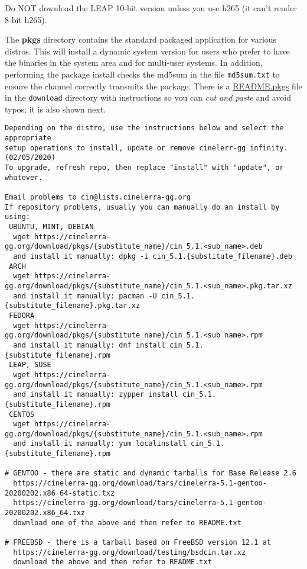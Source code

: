 Do NOT download the LEAP 10-bit version unless you use h265 (it can't render 8-bit h265).

The \textbf{pkgs} directory contains the standard packaged application for various distros.  
This will install a dynamic system version for users who prefer to have the binaries in the system area and for multi-user systems.  
In addition, performing the package install checks the md5sum in the file \texttt{md5sum.txt} to ensure the channel correctly transmits the package.  
There is a {\small \href{https://cinelerra-gg.org/download/README.pkgs}{README.pkgs}} file in the \texttt{download} directory with instructions so you can \textit{ cut and paste} and avoid typos; it is also shown next.

\begin{lstlisting}[numbers=none]
Depending on the distro, use the instructions below and select the appropriate 
setup operations to install, update or remove cinelerr-gg infinity.  (02/05/2020)
To upgrade, refresh repo, then replace "install" with "update", or whatever.

Email problems to cin@lists.cinelerra-gg.org
If repository problems, usually you can manually do an install by using:
 UBUNTU, MINT, DEBIAN
  wget https://cinelerra-gg.org/download/pkgs/{substitute_name}/cin_5.1.<sub_name>.deb
  and install it manually: dpkg -i cin_5.1.{substitute_filename}.deb
 ARCH
  wget https://cinelerra-gg.org/download/pkgs/{substitute_name}/cin_5.1.<sub_name>.pkg.tar.xz
  and install it manually: pacman -U cin_5.1.{substitute_filename}.pkg.tar.xz
 FEDORA
  wget https://cinelerra-gg.org/download/pkgs/{substitute_name}/cin_5.1.<sub_name>.rpm
  and install it manually: dnf install cin_5.1.{substitute_filename}.rpm
 LEAP, SUSE
  wget https://cinelerra-gg.org/download/pkgs/{substitute_name}/cin_5.1.<sub_name>.rpm
  and install it manually: zypper install cin_5.1.{substitute_filename}.rpm
 CENTOS
  wget https://cinelerra-gg.org/download/pkgs/{substitute_name}/cin_5.1.<sub_name>.rpm
  and install it manually: yum localinstall cin_5.1.{substitute_filename}.rpm

# GENTOO - there are static and dynamic tarballs for Base Release 2.6
  https://cinelerra-gg.org/download/tars/cinelerra-5.1-gentoo-20200202.x86_64-static.txz
  https://cinelerra-gg.org/download/tars/cinelerra-5.1-gentoo-20200202.x86_64.txz
  download one of the above and then refer to README.txt

# FREEBSD - there is a tarball based on FreeBSD version 12.1 at
  https://cinelerra-gg.org/download/testing/bsdcin.tar.xz
  download the above and then refer to README.txt


\end{lstlisting}
